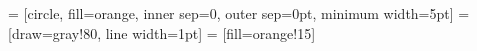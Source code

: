  = [circle, fill=orange, inner sep=0, outer sep=0pt,
  minimum width=5pt]
 = [draw=gray!80, line width=1pt]
 = [fill=orange!15]
